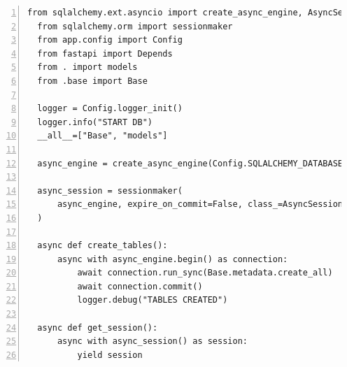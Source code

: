 \documentclass[12pt, letterpaper]{article}
\begin{document}
      
\begin{lstlisting}[frame=single, style=py, numbers=left, label={lst:dbinit}, caption={db: \_\_init\_\_.py}]
  from sqlalchemy.ext.asyncio import create_async_engine, AsyncSession
  from sqlalchemy.orm import sessionmaker
  from app.config import Config
  from fastapi import Depends
  from . import models
  from .base import Base
  
  logger = Config.logger_init()
  logger.info("START DB")
  __all__=["Base", "models"]
  
  async_engine = create_async_engine(Config.SQLALCHEMY_DATABASE_URL)
  
  async_session = sessionmaker(
      async_engine, expire_on_commit=False, class_=AsyncSession
  )
  
  async def create_tables():
      async with async_engine.begin() as connection:
          await connection.run_sync(Base.metadata.create_all)
          await connection.commit()
          logger.debug("TABLES CREATED")
  
  async def get_session():
      async with async_session() as session:
          yield session
\end{lstlisting}
\end{document}
